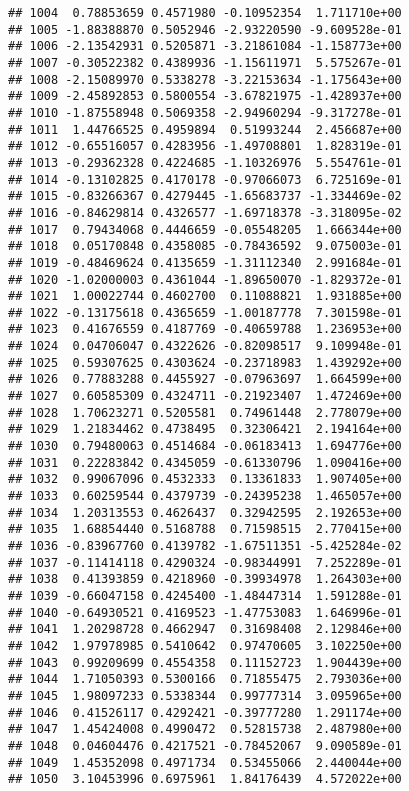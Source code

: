 \documentclass[
]{article}
\begin{document}
\begin{verbatim}
## 1004  0.78853659 0.4571980 -0.10952354  1.711710e+00
## 1005 -1.88388870 0.5052946 -2.93220590 -9.609528e-01
## 1006 -2.13542931 0.5205871 -3.21861084 -1.158773e+00
## 1007 -0.30522382 0.4389936 -1.15611971  5.575267e-01
## 1008 -2.15089970 0.5338278 -3.22153634 -1.175643e+00
## 1009 -2.45892853 0.5800554 -3.67821975 -1.428937e+00
## 1010 -1.87558948 0.5069358 -2.94960294 -9.317278e-01
## 1011  1.44766525 0.4959894  0.51993244  2.456687e+00
## 1012 -0.65516057 0.4283956 -1.49708801  1.828319e-01
## 1013 -0.29362328 0.4224685 -1.10326976  5.554761e-01
## 1014 -0.13102825 0.4170178 -0.97066073  6.725169e-01
## 1015 -0.83266367 0.4279445 -1.65683737 -1.334469e-02
## 1016 -0.84629814 0.4326577 -1.69718378 -3.318095e-02
## 1017  0.79434068 0.4446659 -0.05548205  1.666344e+00
## 1018  0.05170848 0.4358085 -0.78436592  9.075003e-01
## 1019 -0.48469624 0.4135659 -1.31112340  2.991684e-01
## 1020 -1.02000003 0.4361044 -1.89650070 -1.829372e-01
## 1021  1.00022744 0.4602700  0.11088821  1.931885e+00
## 1022 -0.13175618 0.4365659 -1.00187778  7.301598e-01
## 1023  0.41676559 0.4187769 -0.40659788  1.236953e+00
## 1024  0.04706047 0.4322626 -0.82098517  9.109948e-01
## 1025  0.59307625 0.4303624 -0.23718983  1.439292e+00
## 1026  0.77883288 0.4455927 -0.07963697  1.664599e+00
## 1027  0.60585309 0.4324711 -0.21923407  1.472469e+00
## 1028  1.70623271 0.5205581  0.74961448  2.778079e+00
## 1029  1.21834462 0.4738495  0.32306421  2.194164e+00
## 1030  0.79480063 0.4514684 -0.06183413  1.694776e+00
## 1031  0.22283842 0.4345059 -0.61330796  1.090416e+00
## 1032  0.99067096 0.4532333  0.13361833  1.907405e+00
## 1033  0.60259544 0.4379739 -0.24395238  1.465057e+00
## 1034  1.20313553 0.4626437  0.32942595  2.192653e+00
## 1035  1.68854440 0.5168788  0.71598515  2.770415e+00
## 1036 -0.83967760 0.4139782 -1.67511351 -5.425284e-02
## 1037 -0.11414118 0.4290324 -0.98344991  7.252289e-01
## 1038  0.41393859 0.4218960 -0.39934978  1.264303e+00
## 1039 -0.66047158 0.4245400 -1.48447314  1.591288e-01
## 1040 -0.64930521 0.4169523 -1.47753083  1.646996e-01
## 1041  1.20298728 0.4662947  0.31698408  2.129846e+00
## 1042  1.97978985 0.5410642  0.97470605  3.102250e+00
## 1043  0.99209699 0.4554358  0.11152723  1.904439e+00
## 1044  1.71050393 0.5300166  0.71855475  2.793036e+00
## 1045  1.98097233 0.5338344  0.99777314  3.095965e+00
## 1046  0.41526117 0.4292421 -0.39777280  1.291174e+00
## 1047  1.45424008 0.4990472  0.52815738  2.487980e+00
## 1048  0.04604476 0.4217521 -0.78452067  9.090589e-01
## 1049  1.45352098 0.4971734  0.53455066  2.440044e+00
## 1050  3.10453996 0.6975961  1.84176439  4.572022e+00

\end{verbatim}
\end{document}
